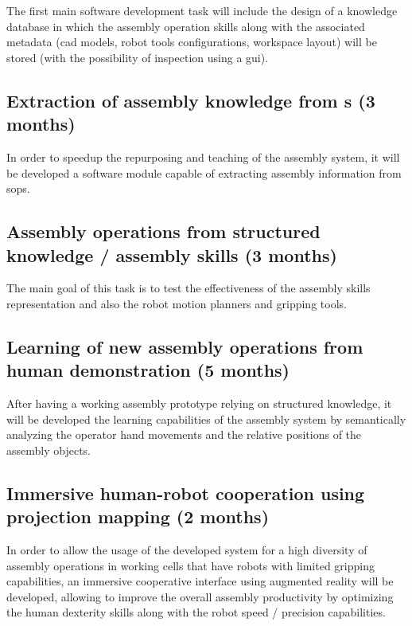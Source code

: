 The first main software development task will include the design of a knowledge database in which the assembly operation skills along with the associated metadata (\gls{cad} models, robot tools configurations, workspace layout) will be stored (with the possibility of inspection using a \gls{gui}).


\subsection{Extraction of assembly knowledge from s (3 months)}

In order to speedup the repurposing and teaching of the assembly system, it will be developed a software module capable of extracting assembly information from \glspl{sop}.


\subsection{Assembly operations from structured knowledge / assembly skills (3 months)}

The main goal of this task is to test the effectiveness of the assembly skills representation and also the robot motion planners and gripping tools.


\subsection{Learning of new assembly operations from human demonstration (5 months)}

After having a working assembly prototype relying on structured knowledge, it will be developed the learning capabilities of the assembly system by semantically analyzing the operator hand movements and the relative positions of the assembly objects.


\subsection{Immersive human-robot cooperation using projection mapping (2 months)}

In order to allow the usage of the developed system for a high diversity of assembly operations in working cells that have robots with limited gripping capabilities, an immersive cooperative interface using augmented reality will be developed, allowing to improve the overall assembly productivity by optimizing the human dexterity skills along with the robot speed / precision capabilities.


